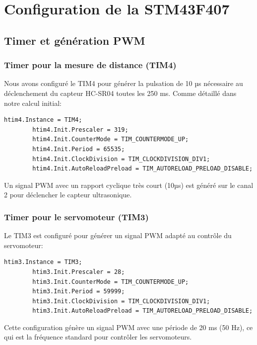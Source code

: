 \section{Configuration de la STM43F407}

\subsection{Timer et génération PWM}

    \subsubsection{Timer pour la mesure de distance (TIM4)}
        Nous avons configuré le TIM4 pour générer la pulsation de 10 µs nécessaire au déclenchement du capteur HC-SR04 toutes les 250 ms. Comme détaillé dans notre calcul initial:

        \begin{lstlisting}[caption={Configuration du TIM4}, label={lst:tim4config}]
        htim4.Instance = TIM4;
        htim4.Init.Prescaler = 319;
        htim4.Init.CounterMode = TIM_COUNTERMODE_UP;
        htim4.Init.Period = 65535;
        htim4.Init.ClockDivision = TIM_CLOCKDIVISION_DIV1;
        htim4.Init.AutoReloadPreload = TIM_AUTORELOAD_PRELOAD_DISABLE;
        \end{lstlisting}

        Un signal PWM avec un rapport cyclique très court (10µs) est généré sur le canal 2 pour déclencher le capteur ultrasonique.

    \subsubsection{Timer pour le servomoteur (TIM3)}
        Le TIM3 est configuré pour générer un signal PWM adapté au contrôle du servomoteur:

        \begin{lstlisting}[caption={Configuration du TIM3}, label={lst:tim3config}]
        htim3.Instance = TIM3;
        htim3.Init.Prescaler = 28;
        htim3.Init.CounterMode = TIM_COUNTERMODE_UP;
        htim3.Init.Period = 59999;
        htim3.Init.ClockDivision = TIM_CLOCKDIVISION_DIV1;
        htim3.Init.AutoReloadPreload = TIM_AUTORELOAD_PRELOAD_DISABLE;
        \end{lstlisting}

        Cette configuration génère un signal PWM avec une période de 20 ms (50 Hz), ce qui est la fréquence standard pour contrôler les servomoteurs.

